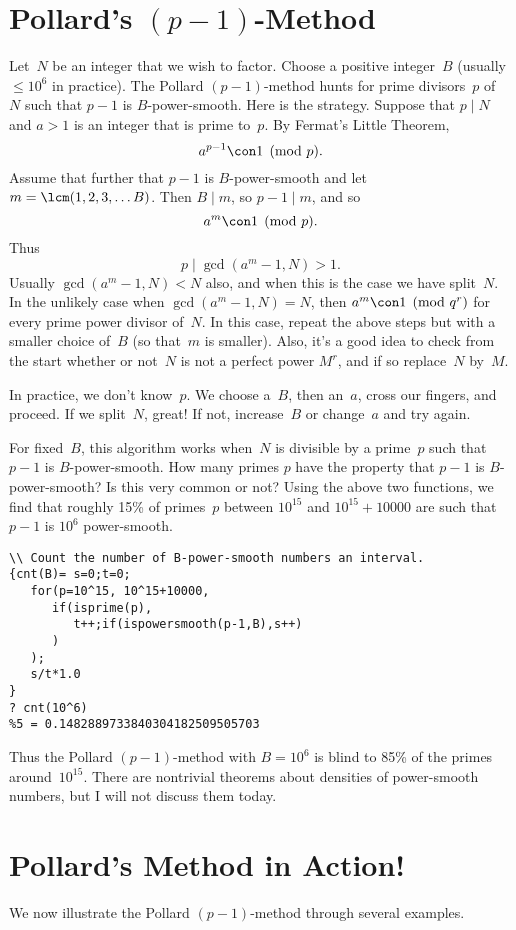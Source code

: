 \documentclass[11pt]{report}
\begin{document}
\section{Pollard's $(p-1)$-Method}
Let~$N$ be an integer that we wish to factor.  Choose a positive
integer~$B$ (usually $\leq 10^6$ in practice).  The Pollard
$(p-1)$-method hunts for prime divisors~$p$ of~$N$ such that $p-1$ is
$B$-power-smooth.  Here is the strategy.
Suppose that $p\mid N$ and $a>1$ is an integer that is prime to~$p$.
By Fermat's Little Theorem,
$$
  a^{p-1}\con 1\pmod{p}.
$$
Assume that further that $p-1$
is $B$-power-smooth and let $m=\lcm(1,2,3,\ldots B)$.  Then
$B\mid m$, so
$p-1\mid m$, and so
$$
  a^m \con 1 \pmod{p}.
$$
Thus
$$
  p\mid \gcd(a^m-1,N) > 1.
$$
Usually $\gcd(a^m-1,N)<N$ also, and when this is the case
we have split~$N$.  In the
unlikely case when $\gcd(a^m-1,N)=N$, then $a^m\con 1\pmod{q^r}$ for
every prime power divisor of~$N$.  In this case, repeat the above
steps but with a smaller choice of~$B$ (so that~$m$ is smaller).
Also, it's a good idea to check from the start whether or
not~$N$ is not a perfect power $M^r$, and if so replace~$N$ by~$M$.

In practice, we don't know~$p$.  We choose a~$B$, then an~$a$,
cross our fingers, and proceed.  If we split~$N$, great!
If not, increase~$B$ or change~$a$ and try again.

For fixed~$B$, this algorithm works when~$N$ is divisible by a
prime~$p$ such that $p-1$ is $B$-power-smooth.  How many primes $p$
have the property that $p-1$ is $B$-power-smooth?    Is this very
common or not?
Using the above two functions, we find that roughly 15\% of
primes~$p$ between $10^{15}$ and $10^{15}+10000$ are such that
$p-1$ is $10^6$ power-smooth.

\begin{verbatim}
\\ Count the number of B-power-smooth numbers an interval.
{cnt(B)= s=0;t=0; 
   for(p=10^15, 10^15+10000,  
      if(isprime(p), 
         t++;if(ispowersmooth(p-1,B),s++)
      )
   ); 
   s/t*1.0
}
? cnt(10^6)
%5 = 0.1482889733840304182509505703
\end{verbatim}
Thus the Pollard $(p-1)$-method with $B=10^6$ is blind to 85\% of the
primes around~$10^{15}$.  There are nontrivial theorems about
densities of power-smooth numbers, but I will not discuss them today.

\section{Pollard's Method in Action!}
We now illustrate the Pollard $(p-1)$-method through several
examples.
\end{document}
